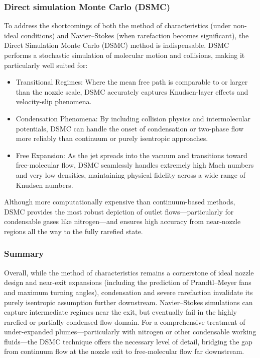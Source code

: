 \subsubsection*{Direct simulation Monte Carlo (DSMC)}
	To address the shortcomings of both the method of characteristics (under non-ideal conditions) and Navier–Stokes (when rarefaction becomes significant), the Direct Simulation Monte Carlo (DSMC) method is indispensable.
	DSMC performs a stochastic simulation of molecular motion and collisions, making it particularly well suited for:
	\begin{itemize}
		\item Transitional Regimes: Where the mean free path is comparable to or larger than the nozzle scale, DSMC accurately captures Knudsen-layer effects and velocity-slip phenomena.
		\item Condensation Phenomena: By including collision physics and intermolecular potentials, DSMC can handle the onset of condensation or two-phase flow more reliably than continuum or purely isentropic approaches. \cite{EMMONS1958}
		\item Free Expansion: As the jet spreads into the vacuum and transitions toward free-molecular flow, DSMC seamlessly handles extremely high Mach numbers and very low densities, maintaining physical fidelity across a wide range of Knudsen numbers.
	\end{itemize}
	Although more computationally expensive than continuum-based methods, DSMC provides the most robust depiction of outlet flows—particularly for condensable gases like nitrogen—and ensures high accuracy from near-nozzle regions all the way to the fully rarefied state.
	\cite{putignano2012supersonic, liu_study_2006}

\subsubsection*{Summary}
	Overall, while the method of characteristics remains a cornerstone of ideal nozzle design and near-exit expansions (including the prediction of Prandtl–Meyer fans and maximum turning angles), condensation and severe rarefaction invalidate its purely isentropic assumption further downstream.
	Navier–Stokes simulations can capture intermediate regimes near the exit, but eventually fail in the highly rarefied or partially condensed flow domain.
	For a comprehensive treatment of under-expanded plumes—particularly with nitrogen or other condensable working fluids—the DSMC technique offers the necessary level of detail, bridging the gap from continuum flow at the nozzle exit to free-molecular flow far downstream.
